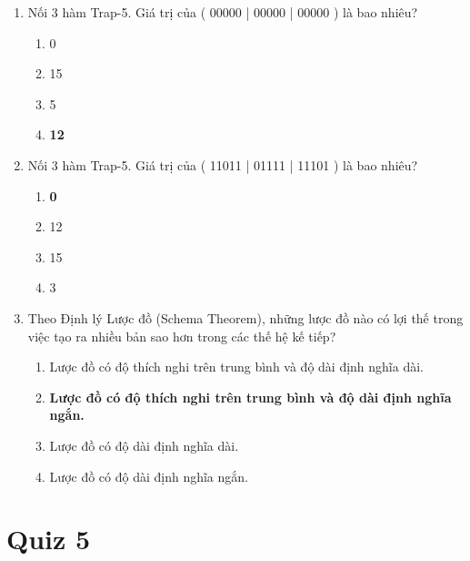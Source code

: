 \documentclass{book}
\begin{document}
\begin{enumerate}
    \item Nối 3 hàm Trap-5. Giá trị của ( 00000 | 00000 | 00000 ) là bao nhiêu?
    \begin{multicols}{2}
        \begin{enumerate}[label=\Alph*]
            \item 0
            \item 15
            \item 5
            \item \textbf{12}
        \end{enumerate}
    \end{multicols}

    \item Nối 3 hàm Trap-5. Giá trị của ( 11011 | 01111 | 11101 ) là bao nhiêu?
    \begin{multicols}{2}
        \begin{enumerate}[label=\Alph*]
            \item \textbf{0}
            \item 12
            \item 15
            \item 3
        \end{enumerate}
    \end{multicols}

    \item Theo Định lý Lược đồ (Schema Theorem), những lược đồ nào có lợi thế trong việc tạo ra nhiều bản sao hơn trong các thế hệ kế tiếp?
    \begin{multicols}{2}
        \begin{enumerate}[label=\Alph*]
            \item Lược đồ có độ thích nghi trên trung bình và độ dài định nghĩa dài.
            \item \textbf{Lược đồ có độ thích nghi trên trung bình và độ dài định nghĩa ngắn.}
            \item Lược đồ có độ dài định nghĩa dài.
            \item Lược đồ có độ dài định nghĩa ngắn.
        \end{enumerate}
    \end{multicols}

\end{enumerate}

\section{Quiz 5}
\end{document}
